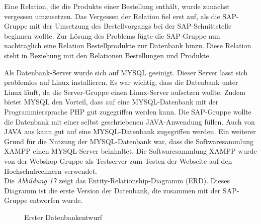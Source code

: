 Eine Relation, die die Produkte einer Bestellung enthält, wurde zunächst vergessen umzusetzen. Das Vergessen der Relation fiel erst auf, als die SAP-Gruppe mit der Umsetzung des Bestellvorgangs bei der SAP-Schnittstelle beginnen wollte. Zur Lösung des Problems fügte die SAP-Gruppe nun nachträglich eine Relation \glqq Bestellprodukte\grqq{} zur Datenbank hinzu. Diese Relation steht in Beziehung mit den Relationen \glqq Bestellungen\grqq{} und \glqq Produkte\grqq{}.

Als Datenbank-Server wurde sich auf MYSQL geeinigt. Dieser Server lässt sich problemlos auf Linux installieren. Es war wichtig, dass die Datenbank unter Linux läuft, da die Server-Gruppe einen Linux-Server aufsetzen wollte. Zudem bietet MYSQL den Vorteil, dass auf eine MYSQL-Datenbank mit der Programmiersprache PHP gut zugegriffen werden kann. Die SAP-Gruppe wollte die Datenbank mit einer selbst geschriebenen JAVA-Anwendung füllen. Auch von JAVA aus kann gut auf eine MYSQL-Datenbank zugegriffen werden. Ein weiterer Grund für die Nutzung der MYSQL-Datenbank war, dass die Softwaresammlung XAMPP einen MYSQL-Server beinhaltet. Die Softwaresammlung XAMPP wurde von der Webshop-Gruppe als Testserver zum Testen der Webseite auf den Hochschulrechnern verwendet. \\
Die \textit{Abbildung 17} zeigt das \glqq Entity-Relationship-Diagramm (ERD)\grqq{}. Dieses Diagramm ist die erste Version der Datenbank, die zusammen mit der SAP-Gruppe entworfen wurde. 

\begin{figure}[H]
	\begin{center}
	\end{center}
	\caption{Erster Datenbankentwurf}
\end{figure}


